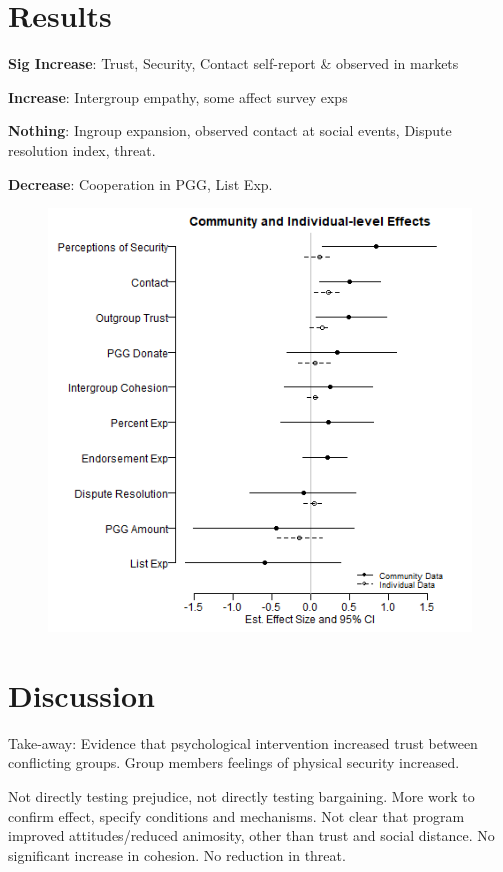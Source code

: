 \documentclass[11pt]{article}
\begin{document}
\section{Results}\label{results}

\textbf{Sig Increase}: Trust, Security, Contact self-report \& observed
in markets

\textbf{Increase}: Intergroup empathy, some affect survey exps

\textbf{Nothing}: Ingroup expansion, observed contact at social events,
Dispute resolution index, threat.

\textbf{Decrease}: Cooperation in PGG, List Exp.

\begin{figure}
\centering
\includegraphics{../../../../figs/ecpn_coefplots_indices.png}
\caption{}
\end{figure}

\section{Discussion}\label{discussion}

Take-away: Evidence that psychological intervention increased trust
between conflicting groups. Group members feelings of physical security
increased.

Not directly testing prejudice, not directly testing bargaining. More
work to confirm effect, specify conditions and mechanisms. Not clear
that program improved attitudes/reduced animosity, other than trust and
social distance. No significant increase in cohesion. No reduction in
threat.
\end{document}
